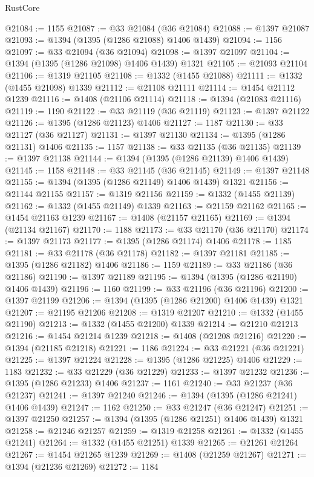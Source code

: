\begin{lexlean}{RustCore}
\begin{coremodule}
@21084 := 1155
@21087 := @33 @21084 (@36 @21084)
@21088 := @1397 @21087
@21093 := @1394 (@1395 (@1286 @21088) @1406 @1439)
@21094 := 1156
@21097 := @33 @21094 (@36 @21094)
@21098 := @1397 @21097
@21104 := @1394 (@1395 (@1286 @21098) @1406 @1439) @1321
@21105 := @21093 @21104
@21106 := @1319 @21105
@21108 := @1332 (@1455 @21088)
@21111 := @1332 (@1455 @21098) @1339
@21112 := @21108 @21111
@21114 := @1454 @21112 @1239
@21116 := @1408 (@21106 @21114)
@21118 := @1394 (@21083 @21116)
@21119 := 1190
@21122 := @33 @21119 (@36 @21119)
@21123 := @1397 @21122
@21126 := @1395 (@1286 @21123) @1406
@21127 := 1187
@21130 := @33 @21127 (@36 @21127)
@21131 := @1397 @21130
@21134 := @1395 (@1286 @21131) @1406
@21135 := 1157
@21138 := @33 @21135 (@36 @21135)
@21139 := @1397 @21138
@21144 := @1394 (@1395 (@1286 @21139) @1406 @1439)
@21145 := 1158
@21148 := @33 @21145 (@36 @21145)
@21149 := @1397 @21148
@21155 := @1394 (@1395 (@1286 @21149) @1406 @1439) @1321
@21156 := @21144 @21155
@21157 := @1319 @21156
@21159 := @1332 (@1455 @21139)
@21162 := @1332 (@1455 @21149) @1339
@21163 := @21159 @21162
@21165 := @1454 @21163 @1239
@21167 := @1408 (@21157 @21165)
@21169 := @1394 (@21134 @21167)
@21170 := 1188
@21173 := @33 @21170 (@36 @21170)
@21174 := @1397 @21173
@21177 := @1395 (@1286 @21174) @1406
@21178 := 1185
@21181 := @33 @21178 (@36 @21178)
@21182 := @1397 @21181
@21185 := @1395 (@1286 @21182) @1406
@21186 := 1159
@21189 := @33 @21186 (@36 @21186)
@21190 := @1397 @21189
@21195 := @1394 (@1395 (@1286 @21190) @1406 @1439)
@21196 := 1160
@21199 := @33 @21196 (@36 @21196)
@21200 := @1397 @21199
@21206 := @1394 (@1395 (@1286 @21200) @1406 @1439) @1321
@21207 := @21195 @21206
@21208 := @1319 @21207
@21210 := @1332 (@1455 @21190)
@21213 := @1332 (@1455 @21200) @1339
@21214 := @21210 @21213
@21216 := @1454 @21214 @1239
@21218 := @1408 (@21208 @21216)
@21220 := @1394 (@21185 @21218)
@21221 := 1186
@21224 := @33 @21221 (@36 @21221)
@21225 := @1397 @21224
@21228 := @1395 (@1286 @21225) @1406
@21229 := 1183
@21232 := @33 @21229 (@36 @21229)
@21233 := @1397 @21232
@21236 := @1395 (@1286 @21233) @1406
@21237 := 1161
@21240 := @33 @21237 (@36 @21237)
@21241 := @1397 @21240
@21246 := @1394 (@1395 (@1286 @21241) @1406 @1439)
@21247 := 1162
@21250 := @33 @21247 (@36 @21247)
@21251 := @1397 @21250
@21257 := @1394 (@1395 (@1286 @21251) @1406 @1439) @1321
@21258 := @21246 @21257
@21259 := @1319 @21258
@21261 := @1332 (@1455 @21241)
@21264 := @1332 (@1455 @21251) @1339
@21265 := @21261 @21264
@21267 := @1454 @21265 @1239
@21269 := @1408 (@21259 @21267)
@21271 := @1394 (@21236 @21269)
@21272 := 1184

\end{coremodule}
\end{lexlean}
